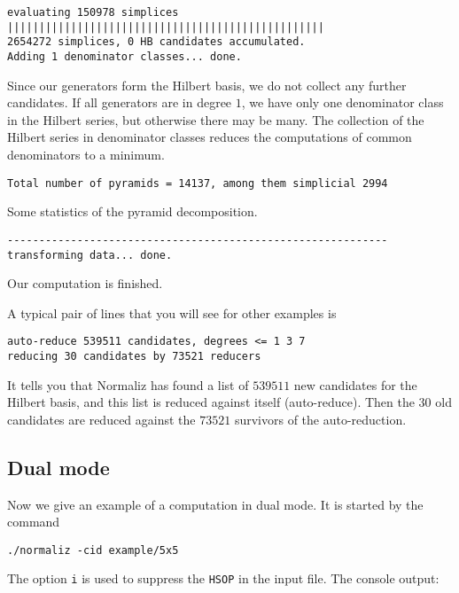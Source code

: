 \begin{Verbatim}
evaluating 150978 simplices
||||||||||||||||||||||||||||||||||||||||||||||||||
2654272 simplices, 0 HB candidates accumulated.
Adding 1 denominator classes... done.
\end{Verbatim}
Since our generators form the Hilbert basis, we do not collect any further candidates. If all generators are in degree $1$, we have only one denominator class in the Hilbert series, but otherwise there may be many. The collection of the Hilbert series in denominator classes reduces the computations of common denominators to a minimum.
\begin{Verbatim}
Total number of pyramids = 14137, among them simplicial 2994
\end{Verbatim}
Some statistics of the pyramid decomposition.
\begin{Verbatim}
------------------------------------------------------------
transforming data... done.
\end{Verbatim}
Our computation is finished.

A typical pair of lines that you will see for other examples is
\begin{Verbatim}
auto-reduce 539511 candidates, degrees <= 1 3 7 
reducing 30 candidates by 73521 reducers
\end{Verbatim}
It tells you that Normaliz has found a list of $539511$ new candidates for the Hilbert basis, and this list is reduced against itself (auto-reduce). Then the $30$ old candidates are reduced against the $73521$ survivors of the auto-reduction.

\subsection{Dual mode}

Now we give an example of a computation in dual mode. It is started by the command
\begin{Verbatim}
./normaliz -cid example/5x5
\end{Verbatim}
The option \verb|i| is used to suppress the \verb|HSOP| in the input file. The console output:

